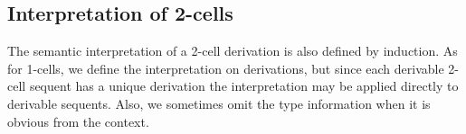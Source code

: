 \documentclass{robinthesisdraft}
\begin{document}
\subsection{Interpretation of 2-cells}
The semantic interpretation of a 2-cell derivation is also defined by induction.
As for 1-cells, we define the interpretation on derivations, but since each
derivable 2-cell sequent has a unique derivation the interpretation may be
applied directly to derivable sequents. Also, we sometimes omit the type
information when it is obvious from the context.
\end{document}
